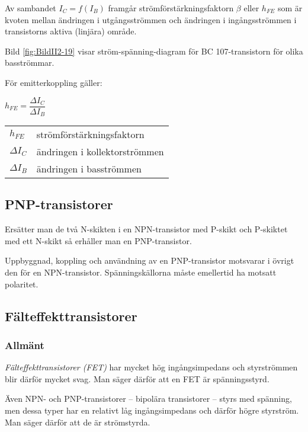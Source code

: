Av sambandet \(I_C = f(I_B)\) framgår strömförstärkningsfaktorn \(\beta\) eller
\(h_{FE}\) som är kvoten mellan ändringen i utgångsströmmen och ändringen i ingångsströmmen i
transistorns aktiva (linjära) område.


Bild \ref{fig:BildII2-19} visar ström-spänning-diagram för BC 107-transistorn för olika basströmmar.

För emitterkoppling gäller:

\(h_{FE} = \dfrac{\Delta I_C}{\Delta I_B}\)

\begin{tabular}{ll}
  \(h_{FE}\) & strömförstärkningsfaktorn \\
  \(\Delta I_C\)   & ändringen i kollektorströmmen \\
  \(\Delta I_B\)   & ändringen i basströmmen \\
\end{tabular}

\subsection{PNP-transistorer}

Ersätter man de två N-skikten i en NPN-transistor med P-skikt och P-skiktet med
ett N-skikt så erhåller man en PNP-transistor.

Uppbyggnad, koppling och användning av en PNP-transistor motsvarar i övrigt den
för en NPN-transistor. Spänningskällorna måste emellertid ha motsatt polaritet.

\subsection{Fälteffekttransistorer}

\subsubsection{Allmänt}

\emph{Fälteffekttransistorer (FET)} har mycket hög ingångsimpedans och styrströmmen blir därför mycket svag.
Man säger därför att en FET är spänningsstyrd.

Även NPN- och PNP-transistorer -- bipolära transistorer -- styrs med spänning, men dessa typer har en relativt låg ingångsimpedans och därför högre styrström. Man säger därför att de är strömstyrda.

